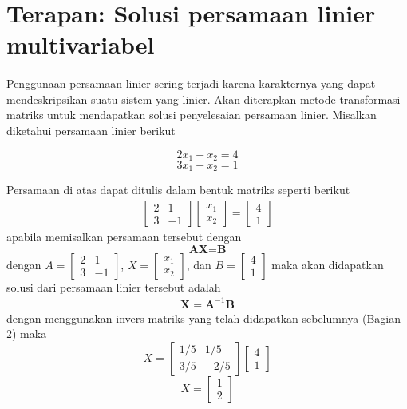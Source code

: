 \documentclass{article}   %
\begin{document}
		\section{Terapan: Solusi persamaan linier multivariabel}
		\paragraph*{} Penggunaan persamaan linier sering terjadi karena karakternya yang dapat mendeskripsikan suatu sistem yang linier. Akan diterapkan metode transformasi matriks untuk mendapatkan solusi penyelesaian persamaan linier. Misalkan diketahui persamaan linier berikut
		
		$$2x_1 + x_2  = 4$$
		$$3x_1 - x_2  = 1$$ 
		
		Persamaan di atas dapat ditulis dalam bentuk matriks seperti berikut
		\begin{align*}
		 \left[
		\begin{array}{rr} 
			2 & 1 \\
			3 & -1 
		\end{array} 
		\right] 
		\left[
		\begin{array}{r} 
			x_1 \\ 
			x_2  
		\end{array}
		\right]
		=
		\left[
		\begin{array}{r} 
			4 \\ 
			1 
		\end{array}
		\right]
		\end{align*}
	apabila memisalkan persamaan tersebut dengan 
	$$\textbf{AX=B}$$
	dengan $A=\left[
	\begin{array}{rr} 
		2 & 1 \\
		3 & -1 
	\end{array} 
	\right]$, $X=\left[
	\begin{array}{r} 
		x_1 \\ 
		x_2  
	\end{array}
	\right]$, dan $B=\left[
	\begin{array}{r} 
		4 \\ 
		1 
	\end{array}
	\right]$ maka akan didapatkan solusi dari persamaan linier tersebut adalah
	\begin{align*}
		\textbf{X}=\textbf{A}^{-1}\textbf{B}
	\end{align*}
	dengan menggunakan invers matriks yang telah didapatkan sebelumnya (Bagian 2) maka
	$$X=\left[
	\begin{array}{rr} 
		1/5 & 1/5 \\
		3/5 & -2/5 
	\end{array} 
	\right]\left[
	\begin{array}{r} 
		4 \\ 
		1 
	\end{array}
	\right]$$
	$$X=\left[
	\begin{array}{r} 
		1 \\ 
		2 
	\end{array}
	\right]$$
	
\end{document}
